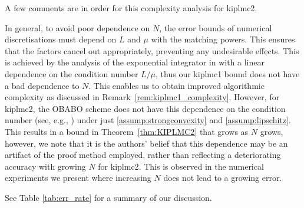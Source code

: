 A few comments are in order for this complexity analysis for \gls*{kiplmc2}.
\begin{remark}\label{rem:kiplmc2_complexity} In general, to avoid poor dependence on $N$, the error bounds of numerical discretisations must depend on $L$ and $\mu$ with the matching powers. This ensures that the factors cancel out appropriately, preventing any undesirable effects. This is achieved by the analysis of the exponential integrator in \citep{dalalyan2018sampling} with a linear dependence on the condition number $L/\mu$, thus our \gls*{kiplmc1} bound does not have a bad dependence to $N$. This enables us to obtain improved algorithmic complexity as discussed in Remark~\ref{rem:kiplmc1_complexity}. However, for \gls*{kiplmc2}, the OBABO scheme does not have this dependence on the condition number (see, e.g., \citep[Table~2]{monmarche2021high}) under just \ref{assump:strongconvexity} and \ref{assump:lipschitz}. This results in a bound in Theorem~\ref{thm:KIPLMC2} that grows as $N$ grows, however, we note that it is the authors' belief that this dependence may be an artifact of the proof method employed, rather than reflecting a deteriorating accuracy with growing $N$ for \gls*{kiplmc2}. This is observed in the numerical experiments we present where increasing $N$ does not lead to a growing error.
\end{remark}


See Table \ref{tab:err_rate} for a summary of our discussion.

